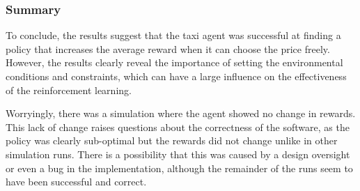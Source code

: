 \subsubsection{Summary}
\label{sec:results:summary}

To conclude, the results suggest that the taxi agent was successful at finding
a policy that increases the average reward when it can choose the price freely.
However, the results clearly reveal the importance of setting the environmental
conditions and constraints, which can have a large influence on the
effectiveness of the reinforcement learning.

Worryingly, there was a simulation where the agent showed no change in rewards.
This lack of change raises questions about the correctness of the software, as
the policy was clearly sub-optimal but the rewards did not change unlike in
other simulation runs. There is a possibility that this was caused by a design
oversight or even a bug in the implementation, although the remainder of the
runs seem to have been successful and correct.

